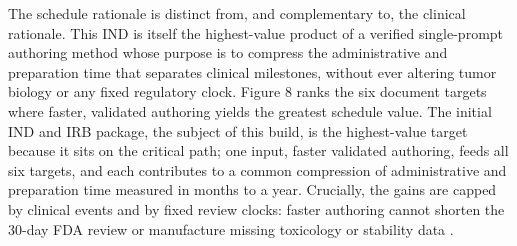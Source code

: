 The schedule rationale is distinct from, and complementary to, the clinical
rationale. This IND is itself the highest-value product of a verified single-prompt
authoring method whose purpose is to compress the administrative and preparation
time that separates clinical milestones, without ever altering tumor biology or any
fixed regulatory clock. Figure 8 ranks the six document targets where faster,
validated authoring yields the greatest schedule value. The initial IND and IRB
package, the subject of this build, is the highest-value target because it sits on
the critical path; one input, faster validated authoring, feeds all six targets, and
each contributes to a common compression of administrative and preparation time
measured in months to a year. Crucially, the gains are capped by clinical events and
by fixed review clocks: faster authoring cannot shorten the 30-day FDA review or
manufacture missing toxicology or stability data \cite{paipredict4x,natlpaiplatf}.

